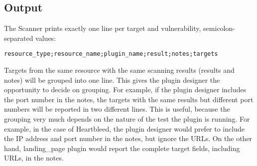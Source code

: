 \subsection{Output}
The Scanner prints exactly one line per target and vulnerability, semicolon-separated values:
\begin{verbatim}
resource_type;resource_name;plugin_name;result;notes;targets
\end{verbatim}
Targets from the same resource with the same scanning results (results and notes) will be grouped into one line. This gives the plugin designer the opportunity to decide on grouping. For example, if the plugin designer includes the port number in the notes, the targets with the same results but different port numbers will be reported in two different lines. This is useful, because the grouping very much depends on the nature of the test the plugin is running. For example, in the case of Heartbleed, the plugin designer would prefer to include the IP address and port number in the notes, but ignore the URLs. On the other hand, landing\_page plugin would report the complete target fields, including URLs, in the notes.
